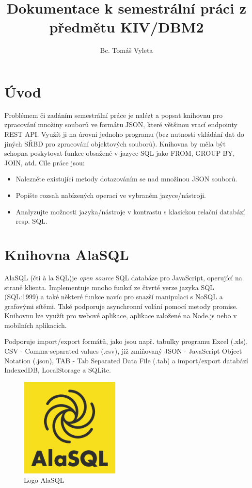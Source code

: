 \documentclass[a4, titlepage]{article}
\begin{document}
\title{Dokumentace k semestrální práci z předmětu KIV/DBM2}
\author{Bc. Tomáš Vyleta}
\date{}

\maketitle

\tableofcontents
\newpage

\section*{Úvod}
Problémem či zadáním semestrální práce je nalézt a popsat knihovnu pro zpracování množiny souborů ve formátu JSON, které většinou vrací endpointy REST API. Využít ji na úrovni jednoho programu (bez nutnosti vkládání dat do jiných SŘBD pro zpracování objektových souborů). Knihovna by měla být schopna poskytovat funkce obsažené v jazyce SQL jako FROM, GROUP BY, JOIN, atd. Cíle práce jsou: 

\begin{itemize}
	\item Nalezněte existující metody dotazováním se nad množinou JSON souborů.
	\item Popište rozsah nabízených operací ve vybraném jazyce/nástroji.
	\item Analyzujte možnosti jazyka/nástroje v kontrastu s klasickou relační databází resp. SQL.
\end{itemize}


\section{Knihovna AlaSQL}
AlaSQL (čti à la SQL)je \textit{open source} SQL databáze pro JavaScript, operující na straně klienta. Implementuje mnoho funkcí ze čtvrté verze jazyka SQL (SQL:1999) a také některé funkce navíc pro snazší manipulaci s NoSQL a grafovými sítěmi. Také podporuje asynchronní volání pomocí metody promise. Knihovnu lze využít pro webové aplikace, aplikace založené na Node.js nebo v mobilních aplikacích.

Podporuje import/export formátů, jako jsou např. tabulky programu Excel (.xls), CSV - Comma-separated values (.csv), již zmiňovaný JSON - JavaScript Object Notation (.json), TAB - Tab Separated Data File (.tab) a import/export databází IndexedDB, LocalStorage a SQLite.

\begin{figure}[h]
    \centering
    \includegraphics[width=5cm]{alasql_logo}
    \caption{Logo AlaSQL}
\end{figure}
\end{document}
